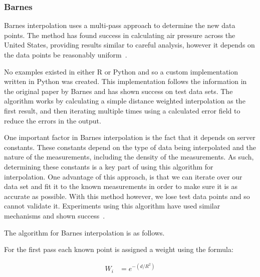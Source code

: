 

        \subsubsection{Barnes}\label{background_interpolation_methods_barnes}

            Barnes interpolation uses a multi-pass approach to determine the new data points. The method has found success in calculating air pressure across the United States, providing results similar to careful analysis, however it depends on the data points be reasonably uniform~\cite{barnesinterpolation}.

            No examples existed in either R or Python and so a custom implementation written in Python was created. This implementation follows the information in the original paper by Barnes and has shown success on test data sets. The algorithm works by calculating a simple distance weighted interpolation as the first result, and then iterating multiple times using a calculated error field to reduce the errors in the output. 

            One important factor in Barnes interpolation is the fact that it depends on server constants. These constants depend on the type of data being interpolated and the nature of the measurements, including the density of the measurements. As such, determining these constants is a key part of using this algorithm for interpolation. One advantage of this approach, is that we can iterate over our data set and fit it to the known measurements in order to make sure it is as accurate as possible. With this method however, we lose test data points and so cannot validate it. Experiments using this algorithm have used similar mechanisms and shown success~\cite{pmconcentrationmaps}.

            The algorithm for Barnes interpolation is as follows.

            For the first pass each known point is assigned a weight using the formula: 

            \begin{align*}
                W_{i} &= e^{-(d/R^{2})}
            \end{align*}
            
